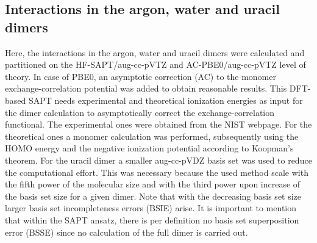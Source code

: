 \documentclass[a4paper,12pt, parskip=half]{scrartcl}
\begin{document}
\subsection{Interactions in the argon, water and uracil dimers}
%
Here, the interactions in the argon, water and uracil dimers were calculated and partitioned on the HF-SAPT/aug-cc-pVTZ\autocite[]{aug-cc-pvxz,aug-cc-pvxz-al_ar} and AC-PBE0\autocite[]{pbe0}/aug-cc-pVTZ level of theory. In case of PBE0, an asymptotic correction (AC) to the monomer exchange-correlation potential was added to obtain reasonable results. This DFT-based SAPT needs experimental and theoretical ionization energies as input for the dimer calculation to asymptotically correct the exchange-correlation functional. The experimental ones were obtained from the NIST webpage\autocite[]{nist}. For the theoretical ones a monomer calculation was performed, subsequently using the HOMO energy and the negative ionization potential according to Koopman's theorem. For the uracil dimer a smaller aug-cc-pVDZ basis set was used to reduce the computational effort. This was necessary because the used method scale  with  the  fifth  power  of  the  molecular  size  and  with  the  third  power  upon increase of the basis set size for a given dimer.\autocite{df-dft-sapt} Note that with the decreasing basis set size larger basis set incompleteness errors (BSIE) arise. It is important to mention that within the SAPT ansatz, there is per definition no basis set superposition error (BSSE) since no calculation of the full dimer is carried out.
\end{document}
